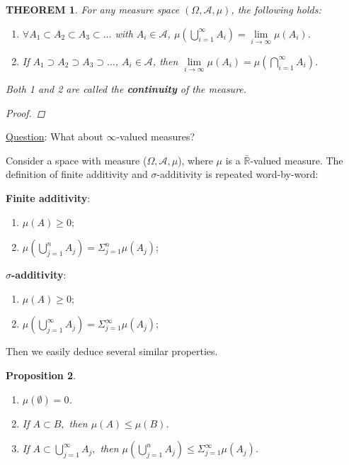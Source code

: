 \documentclass[12pt]{article}
\theoremstyle{blueplain}
\newtheorem{theorem}{THEOREM}[section]
\newtheorem{proposition}[theorem]{Proposition}
\theoremstyle{bluedef}
\theoremstyle{blueremark}
\newcommand{\R}{\mathbb{R}}
\numberwithin{equation}{section}
\begin{document}
\begin{theorem}
  For any measure space $(\Omega, \mathcal{A}, \mu)$, the following holds:
  \begin{enumerate}
    \item $\forall A_1 \subset A_2 \subset A_3 \subset \ldots$ with $A_i \in \mathcal{A}$, $\mu(\bigcup_{i=1}^{\infty} A_i) = \lim\limits_{i \to \infty} \mu(A_i)$.
    \item If $A_1 \supset A_2 \supset A_3 \supset \ldots$, $A_i \in \mathcal{A}$, then $\lim\limits_{i \to \infty} \mu(A_i) = \mu(\bigcap_{i=1}^{\infty} A_i)$.
  \end{enumerate}

  Both 1 and 2 are called the \textbf{continuity} of the measure.

  \begin{proof}

  \end{proof}
\end{theorem}

\underline{Question}: What about $\infty$-valued measures?

Consider a space with measure ($\Omega, \mathcal{A}, \mu$), where $\mu$ is a $\bar{\R}$-valued measure. The definition of finite additivity and $\sigma$-additivity is repeated word-by-word:

\textbf{Finite additivity}:
\begin{enumerate}
  \item $\mu(A) \geq 0$;
  \item $\mu(\bigcup_{j=1}^{n} A_j) = \Sigma_{j=1}^{n} \mu(A_j)$;
\end{enumerate}

\textbf{$\sigma$-additivity}:
\begin{enumerate}
  \item $\mu(A) \geq 0$;
  \item $\mu(\bigcup_{j=1}^{\infty} A_j) = \Sigma_{j=1}^{\infty} \mu(A_j)$;
\end{enumerate}

Then we easily deduce several similar properties.

\begin{proposition}
  \begin{enumerate}
    \item $\mu(\emptyset) = 0$.
    \item If $A \subset B,$ then $\mu(A) \leq \mu(B)$.
    \item If $A \subset \bigcup_{j=1}^{\infty} A_j,$ then $\mu(\bigcup_{j=1}^n A_j) \leq \Sigma_{j=1}^{\infty} \mu(A_j)$.
  \end{enumerate}
\end{proposition}
\end{document}
